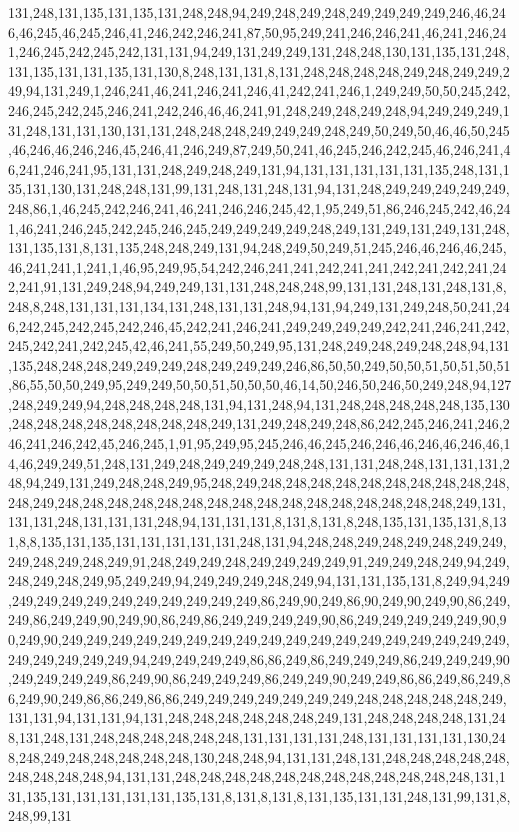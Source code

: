 131,248,131,135,131,135,131,248,248,94,249,248,249,248,249,249,249,249,246,46,246,46,245,46,245,246,41,246,242,246,241,87,50,95,249,241,246,246,241,46,241,246,241,246,245,242,245,242,131,131,94,249,131,249,249,131,248,248,130,131,135,131,248,131,135,131,131,135,131,130,8,248,131,131,8,131,248,248,248,248,249,248,249,249,249,94,131,249,1,246,241,46,241,246,241,246,41,242,241,246,1,249,249,50,50,245,242,246,245,242,245,246,241,242,246,46,46,241,91,248,249,248,249,248,94,249,249,249,131,248,131,131,130,131,131,248,248,248,249,249,249,248,249,50,249,50,46,46,50,245,46,246,46,246,246,45,246,41,246,249,87,249,50,241,46,245,246,242,245,46,246,241,46,241,246,241,95,131,131,248,249,248,249,131,94,131,131,131,131,131,135,248,131,135,131,130,131,248,248,131,99,131,248,131,248,131,94,131,248,249,249,249,249,249,248,86,1,46,245,242,246,241,46,241,246,246,245,42,1,95,249,51,86,246,245,242,46,241,46,241,246,245,242,245,246,245,249,249,249,249,248,249,131,249,131,249,131,248,131,135,131,8,131,135,248,248,249,131,94,248,249,50,249,51,245,246,46,246,46,245,46,241,241,1,241,1,46,95,249,95,54,242,246,241,241,242,241,241,242,241,242,241,242,241,91,131,249,248,94,249,249,131,131,248,248,248,99,131,131,248,131,248,131,8,248,8,248,131,131,131,134,131,248,131,131,248,94,131,94,249,131,249,248,50,241,246,242,245,242,245,242,246,45,242,241,246,241,249,249,249,249,242,241,246,241,242,245,242,241,242,245,42,46,241,55,249,50,249,95,131,248,249,248,249,248,248,94,131,135,248,248,248,249,249,249,248,249,249,249,246,86,50,50,249,50,50,51,50,51,50,51,86,55,50,50,249,95,249,249,50,50,51,50,50,50,46,14,50,246,50,246,50,249,248,94,127,248,249,249,94,248,248,248,248,131,94,131,248,94,131,248,248,248,248,248,135,130,248,248,248,248,248,248,248,248,249,131,249,248,249,248,86,242,245,246,241,246,246,241,246,242,45,246,245,1,91,95,249,95,245,246,46,245,246,246,46,246,46,246,46,14,46,249,249,51,248,131,249,248,249,249,249,248,248,131,131,248,248,131,131,131,248,94,249,131,249,248,248,249,95,248,249,248,248,248,248,248,248,248,248,248,248,248,249,248,248,248,248,248,248,248,248,248,248,248,248,248,248,248,248,249,131,131,131,248,131,131,131,248,94,131,131,131,8,131,8,131,8,248,135,131,135,131,8,131,8,8,135,131,135,131,131,131,131,131,248,131,94,248,248,249,248,249,248,249,249,249,248,249,248,249,91,248,249,249,248,249,249,249,249,91,249,249,248,249,94,249,248,249,248,249,95,249,249,94,249,249,249,248,249,94,131,131,135,131,8,249,94,249,249,249,249,249,249,249,249,249,249,249,86,249,90,249,86,90,249,90,249,90,86,249,249,86,249,249,90,249,90,86,249,86,249,249,249,249,90,86,249,249,249,249,249,90,90,249,90,249,249,249,249,249,249,249,249,249,249,249,249,249,249,249,249,249,249,249,249,249,249,249,94,249,249,249,249,86,86,249,86,249,249,249,86,249,249,249,90,249,249,249,249,86,249,90,86,249,249,249,86,249,249,90,249,249,86,86,249,86,249,86,249,90,249,86,86,249,86,86,249,249,249,249,249,249,249,248,248,248,248,248,249,131,131,94,131,131,94,131,248,248,248,248,248,248,249,131,248,248,248,248,131,248,131,248,131,248,248,248,248,248,248,131,131,131,131,248,131,131,131,131,130,248,248,249,248,248,248,248,248,130,248,248,94,131,131,248,131,248,248,248,248,248,248,248,248,248,94,131,131,248,248,248,248,248,248,248,248,248,248,248,248,131,131,135,131,131,131,131,131,135,131,8,131,8,131,8,131,135,131,131,248,131,99,131,8,248,99,131
